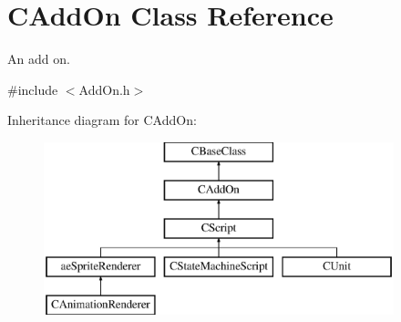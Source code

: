 \hypertarget{class_c_add_on}{}\section{C\+Add\+On Class Reference}
\label{class_c_add_on}


An add on.  




{\ttfamily \#include $<$Add\+On.\+h$>$}

Inheritance diagram for C\+Add\+On\+:\begin{figure}[H]
\begin{center}
\leavevmode
\includegraphics[height=5.000000cm]{class_c_add_on}
\end{center}
\end{figure}
